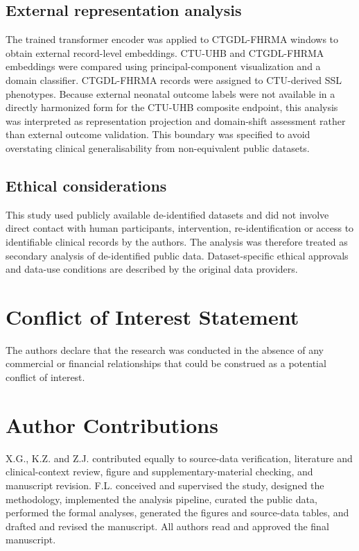 \documentclass[utf8]{FrontiersinHarvard}
\begin{document}
\subsection{External representation analysis}

The trained transformer encoder was applied to CTGDL-FHRMA windows to obtain external record-level embeddings. CTU-UHB and CTGDL-FHRMA embeddings were compared using principal-component visualization and a domain classifier. CTGDL-FHRMA records were assigned to CTU-derived SSL phenotypes. Because external neonatal outcome labels were not available in a directly harmonized form for the CTU-UHB composite endpoint, this analysis was interpreted as representation projection and domain-shift assessment rather than external outcome validation. This boundary was specified to avoid overstating clinical generalisability from non-equivalent public datasets.

\subsection{Ethical considerations}

This study used publicly available de-identified datasets and did not involve direct contact with human participants, intervention, re-identification or access to identifiable clinical records by the authors. The analysis was therefore treated as secondary analysis of de-identified public data. Dataset-specific ethical approvals and data-use conditions are described by the original data providers.

        \section*{Conflict of Interest Statement}
        The authors declare that the research was conducted in the absence of any commercial or financial relationships that could be construed as a potential conflict of interest.

        \section*{Author Contributions}
        X.G., K.Z. and Z.J. contributed equally to source-data verification, literature and clinical-context review, figure and supplementary-material checking, and manuscript revision. F.L. conceived and supervised the study, designed the methodology, implemented the analysis pipeline, curated the public data, performed the formal analyses, generated the figures and source-data tables, and drafted and revised the manuscript. All authors read and approved the final manuscript.
\end{document}
